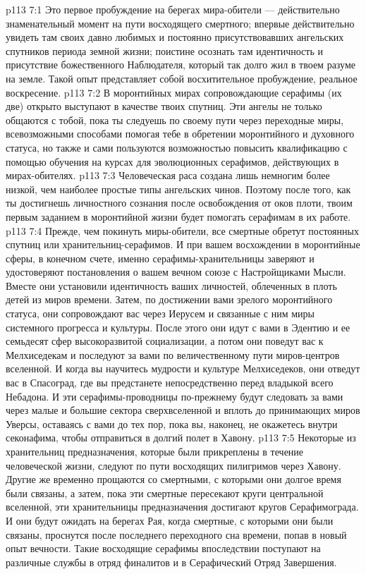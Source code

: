\vs p113 7:1 Это первое пробуждение на берегах мира\hyp{}обители --- действительно знаменательный момент на пути восходящего смертного; впервые действительно увидеть там своих давно любимых и постоянно присутствовавших ангельских спутников периода земной жизни; поистине осознать там идентичность и присутствие божественного Наблюдателя, который так долго жил в твоем разуме на земле. Такой опыт представляет собой восхитительное пробуждение, реальное воскресение.
\vs p113 7:2 В моронтийных мирах сопровождающие серафимы (их две) открыто выступают в качестве твоих спутниц. Эти ангелы не только общаются с тобой, пока ты следуешь по своему пути через переходные миры, всевозможными способами помогая тебе в обретении моронтийного и духовного статуса, но также и сами пользуются возможностью повысить квалификацию с помощью обучения на курсах для эволюционных серафимов, действующих в мирах\hyp{}обителях.
\vs p113 7:3 Человеческая раса создана лишь немногим более низкой, чем наиболее простые типы ангельских чинов. Поэтому после того, как ты достигнешь личностного сознания после освобождения от оков плоти, твоим первым заданием в моронтийной жизни будет помогать серафимам в их работе.
\vs p113 7:4 Прежде, чем покинуть миры\hyp{}обители, все смертные обретут постоянных спутниц или хранительниц\hyp{}серафимов. И при вашем восхождении в моронтийные сферы, в конечном счете, именно серафимы\hyp{}хранительницы заверяют и удостоверяют постановления о вашем вечном союзе с Настройщиками Мысли. Вместе они установили идентичность ваших личностей, облеченных в плоть детей из миров времени. Затем, по достижении вами зрелого моронтийного статуса, они сопровождают вас через Иерусем и связанные с ним миры системного прогресса и культуры. После этого они идут с вами в Эдентию и ее семьдесят сфер высокоразвитой социализации, а потом они поведут вас к Мелхиседекам и последуют за вами по величественному пути миров\hyp{}центров вселенной. И когда вы научитесь мудрости и культуре Мелхиседеков, они отведут вас в Спасоград, где вы предстанете непосредственно перед владыкой всего Небадона. И эти серафимы\hyp{}проводницы по\hyp{}прежнему будут следовать за вами через малые и большие сектора сверхвселенной и вплоть до принимающих миров Уверсы, оставаясь с вами до тех пор, пока вы, наконец, не окажетесь внутри секонафима, чтобы отправиться в долгий полет в Хавону.
\vs p113 7:5 Некоторые из хранительниц предназначения, которые были прикреплены в течение человеческой жизни, следуют по пути восходящих пилигримов через Хавону. Другие же временно прощаются со смертными, с которыми они долгое время были связаны, а затем, пока эти смертные пересекают круги центральной вселенной, эти хранительницы предназначения достигают кругов Серафимограда. И они будут ожидать на берегах Рая, когда смертные, с которыми они были связаны, проснутся после последнего переходного сна времени, попав в новый опыт вечности. Такие восходящие серафимы впоследствии поступают на различные службы в отряд финалитов и в Серафический Отряд Завершения.
